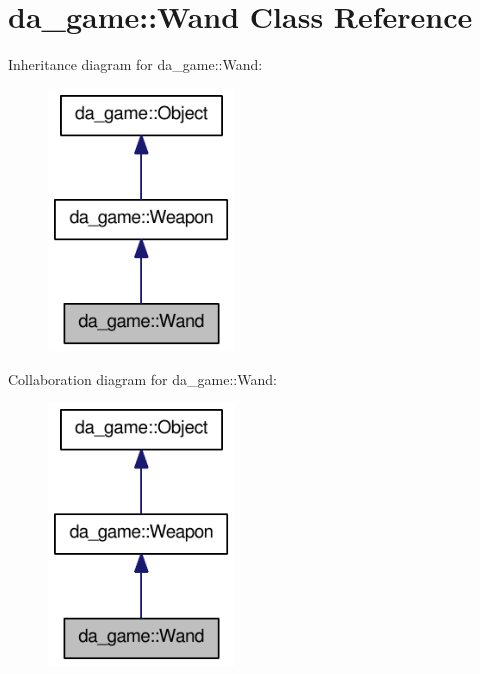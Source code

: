 \hypertarget{classda__game_1_1Wand}{
\section{da\_\-game::Wand Class Reference}
\label{classda__game_1_1Wand}
}
Inheritance diagram for da\_\-game::Wand:\nopagebreak
\begin{figure}[H]
\begin{center}
\leavevmode
\includegraphics[width=140pt]{classda__game_1_1Wand__inherit__graph}
\end{center}
\end{figure}
Collaboration diagram for da\_\-game::Wand:\nopagebreak
\begin{figure}[H]
\begin{center}
\leavevmode
\includegraphics[width=140pt]{classda__game_1_1Wand__coll__graph}
\end{center}
\end{figure}
